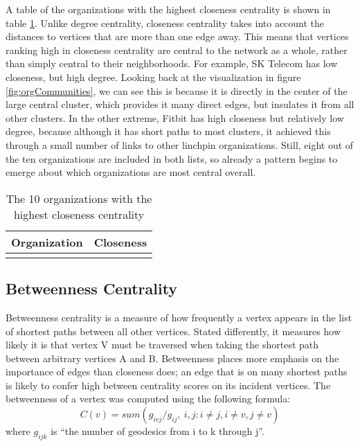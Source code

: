 A table of the organizations with the highest closeness centrality is shown in table \ref{tab:closeness}. Unlike degree centrality, closeness centrality takes into account the distances to vertices that are more than one edge away. This means that vertices ranking high in closeness centrality are central to the network as a whole, rather than simply central to their neighborhoods. For example, SK Telecom has low closeness, but high degree. Looking back at the visualization in figure \ref{fig:orgCommunities}, we can see this is because it is directly in the center of the large central cluster, which provides it many direct edges, but insulates it from all other clusters. In the other extreme, Fitbit has high closeness but relatively low degree, because although it has short paths to most clusters, it achieved this through a small number of links to other linchpin organizations. Still, eight out of the ten organizations are included in both lists, so already a pattern begins to emerge about which organizations are most central overall.

\begin{table}
	\begin{tabular}{l|c}%
		\bfseries Organization & \bfseries Closeness%
		\csvreader[head to column names]{closeness.csv}{}%
		{\\\hline\organizationb & \scoreb}%
	\end{tabular}
	\centering
	\caption{The 10 organizations with the highest closeness centrality}\label{tab:closeness}
\end{table}

\subsection{Betweenness Centrality}
Betweenness centrality is a measure of how frequently a vertex appears in the list of shortest paths between all other vertices. Stated differently, it measures how likely it is that vertex V must be traversed when taking the shortest path between arbitrary vertices A and B. Betweenness places more emphasis on the importance of edges than closeness does; an edge that is on many shortest paths is likely to confer high between centrality scores on its incident vertices. The betweenness of a vertex was computed using the following formula:
\begin{equation*}
C(v) = sum( g_{ivj} / g_{ij},\:i,j: i \neq j,i \neq v,j \neq v )
\end{equation*}
where $g_{ijk}$ is ``the number of geodesics from i to k through j''\cite{butts}. 

